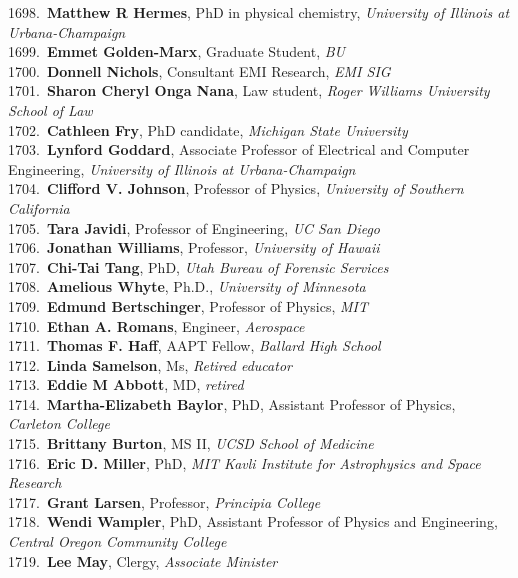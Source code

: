 1698.~{\bf Matthew R Hermes}, PhD in physical chemistry, {\sl University of Illinois at Urbana-Champaign} \\
1699.~{\bf Emmet Golden-Marx}, Graduate Student, {\sl BU} \\
1700.~{\bf Donnell Nichols}, Consultant EMI Research, {\sl EMI SIG} \\
1701.~{\bf Sharon Cheryl Onga Nana}, Law student, {\sl Roger Williams University School of Law} \\
1702.~{\bf Cathleen Fry}, PhD candidate, {\sl Michigan State University} \\
1703.~{\bf Lynford Goddard}, Associate Professor of Electrical and Computer Engineering, {\sl University of Illinois at Urbana-Champaign} \\
1704.~{\bf Clifford V. Johnson}, Professor of Physics, {\sl University of Southern California} \\
1705.~{\bf Tara Javidi}, Professor of Engineering, {\sl UC San Diego} \\
1706.~{\bf Jonathan Williams}, Professor, {\sl University of Hawaii} \\
1707.~{\bf Chi-Tai Tang}, PhD, {\sl Utah Bureau of Forensic Services} \\
1708.~{\bf Amelious Whyte}, Ph.D., {\sl University of Minnesota} \\
1709.~{\bf Edmund Bertschinger}, Professor of Physics, {\sl MIT} \\
1710.~{\bf Ethan A. Romans}, Engineer, {\sl Aerospace} \\
1711.~{\bf Thomas F. Haff}, AAPT Fellow, {\sl Ballard High School} \\
1712.~{\bf Linda Samelson}, Ms, {\sl Retired educator} \\
1713.~{\bf Eddie M Abbott}, MD, {\sl retired} \\
1714.~{\bf Martha-Elizabeth Baylor}, PhD, Assistant Professor of Physics, {\sl Carleton College} \\
1715.~{\bf Brittany Burton}, MS II, {\sl UCSD School of Medicine} \\
1716.~{\bf Eric D. Miller}, PhD, {\sl MIT Kavli Institute for Astrophysics and Space Research} \\
1717.~{\bf Grant Larsen}, Professor, {\sl Principia College} \\
1718.~{\bf Wendi Wampler}, PhD, Assistant Professor of Physics and Engineering, {\sl Central Oregon Community College} \\
1719.~{\bf Lee May}, Clergy, {\sl Associate Minister} \\
